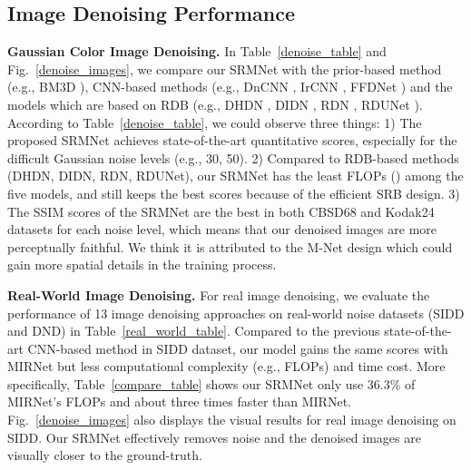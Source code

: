 \documentclass{article}
\begin{document}
\subsection{Image Denoising Performance}
\noindent\textbf{Gaussian Color Image Denoising.} In Table~\ref{denoise_table} and Fig.~\ref{denoise_images}, we compare our SRMNet with the prior-based method (e.g., BM3D \cite{01}), CNN-based methods (e.g., DnCNN \cite{04}, IrCNN \cite{17}, FFDNet \cite{16}) and the models which are based on RDB (e.g., DHDN \cite{14}, DIDN \cite{44}, RDN \cite{07}, RDUNet \cite{15}). According to Table~\ref{denoise_table}, we could observe three things: 1) The proposed SRMNet achieves state-of-the-art quantitative scores, especially for the difficult Gaussian noise levels (e.g., 30, 50). 2) Compared to RDB-based methods (DHDN, DIDN, RDN, RDUNet), our SRMNet has the least FLOPs () among the five models, and still keeps the best scores because of the efficient SRB design. 3) The SSIM scores of the SRMNet are the best in both CBSD68 and Kodak24 datasets for each noise level, which means that our denoised images are more perceptually faithful. We think it is attributed to the M-Net design which could gain more spatial details in the training process.

\noindent\textbf{Real-World Image Denoising.} For real image denoising, we evaluate the performance of 13 image denoising approaches on real-world noise datasets (SIDD and DND) in Table~\ref{real_world_table}. Compared to the previous state-of-the-art CNN-based method \cite{20} in SIDD dataset, our model gains the same scores with MIRNet but less computational complexity (e.g., FLOPs) and time cost. More specifically, Table~\ref{compare_table} shows our SRMNet only use 36.3\% of MIRNet's FLOPs and about three times faster than MIRNet. Fig.~\ref{denoise_images} also displays the visual results for real image denoising on SIDD. Our SRMNet effectively removes noise and the denoised images are visually closer to the ground-truth.

\begin{table}[!t]\small \caption{Comparison of the PSNR and FLOPs for MIRNet \cite{20}, MPRNet \cite{30} and our method (SRMNet). We did the test on SIDD validation set which has 1,280 patches where FLOPs are estimated on the input with shape of . The inference times are measured on the computer equipped with NVIDIA GTX 1080Ti GPU.}
\label{compare_table}
\begin{center}
\end{center}
\end{table}
\end{document}
